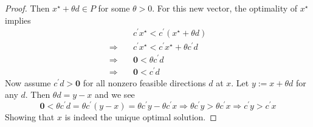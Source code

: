 \documentclass{article}
\begin{document}
\begin{jacklist}
\begin{itemize}
\begin{proof}
                Then $x^\star + \theta d \in P$ for some $\theta > 0$. For this new vector, the optimality of $x^\star$ implies 
                \begin{align*}
                    &c^\prime x^\star < c^\prime(x^\star + \theta d) \\
                    \Rightarrow \quad &c^\prime x^\star < c^\prime x^\star + \theta c^\prime d \\
                    \Rightarrow \quad &\textbf{0} < \theta c^\prime d \\
                    \Rightarrow \quad &\textbf{0} < c^\prime d
                \end{align*}
                Now assume $c^\prime d > \textbf{0}$ for all nonzero feasible directions $d$ at $x$. Let $y := x + \theta d$ for any $d$.
                Then $\theta d = y - x$ and we see 
                \[ 
                    \textbf{0} < \theta c^\prime d = \theta c^\prime(y-x) = \theta c^\prime y - \theta c^\prime x \Rightarrow 
                    \theta c^\prime y > \theta c^\prime x \Rightarrow c^\prime y > c^\prime x
                \] 
                Showing that $x$ is indeed the unique optimal solution.
            \end{proof}
    \end{itemize}


\end{jacklist}
\end{document}
